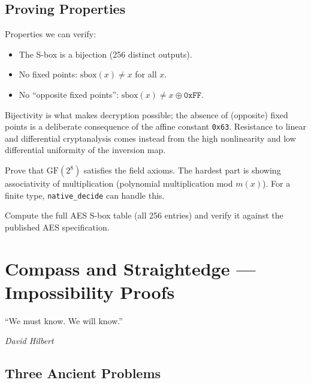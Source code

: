 \documentclass[11pt, a4paper, oneside]{book}
\newcommand{\GF}{\mathrm{GF}}
\newcommand{\lc}[1]{\texttt{#1}}
\newcounter{exercise}[chapter]
\begin{document}
\section{Proving Properties}

Properties we can verify:
\begin{itemize}[nosep]
\item The S-box is a bijection (256 distinct outputs).
\item No fixed points: $\text{sbox}(x) \neq x$ for all $x$.
\item No ``opposite fixed points'': $\text{sbox}(x) \neq x \oplus \texttt{0xFF}$.
\end{itemize}

Bijectivity is what makes decryption possible; the absence of (opposite) fixed
points is a deliberate consequence of the affine constant \texttt{0x63}.
Resistance to linear and differential cryptanalysis comes instead from the
high nonlinearity and low differential uniformity of the inversion map.

\begin{exercisebox}[title={Exercise 12.1}]
Prove that $\GF(2^8)$ satisfies the field axioms. The hardest part is
showing associativity of multiplication (polynomial multiplication mod $m(x)$).
For a finite type, \lc{native\_decide} can handle this.
\end{exercisebox}

\begin{exercisebox}[title={Exercise 12.2}]
Compute the full AES S-box table (all 256 entries) and verify it against the
published AES specification.
\end{exercisebox}

\chapter{Compass and Straightedge --- Impossibility Proofs}

\epigraph{``We must know. We will know.''}{\textit{David Hilbert}}

\section{Three Ancient Problems}
\end{document}
